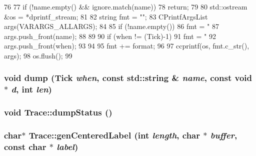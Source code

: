 \begin{DoxyCode}
76 {
77     if (!name.empty() && ignore.match(name))
78         return;
79 
80     std::ostream &os = *dprintf_stream;
81 
82     string fmt = "";
83     CPrintfArgsList args(VARARGS_ALLARGS);
84 
85     if (!name.empty()) {
86         fmt = "%
87         args.push_front(name);
88     }
89 
90     if (when != (Tick)-1) {
91         fmt = "%
92         args.push_front(when);
93     }
94 
95     fmt += format;
96 
97     ccprintf(os, fmt.c_str(), args);
98     os.flush();
99 }
\end{DoxyCode}
\hypertarget{namespaceTrace_a2fa429d80084fb5be809ab7b728be345}{
\subsubsection[{dump}]{\setlength{\rightskip}{0pt plus 5cm}void dump ({\bf Tick} {\em when}, \/  const std::string \& {\em name}, \/  const void $\ast$ {\em d}, \/  int {\em len})}}
\label{namespaceTrace_a2fa429d80084fb5be809ab7b728be345}
\hypertarget{namespaceTrace_a63d683419f79ed96f6bc3032736c4d4d}{
\subsubsection[{dumpStatus}]{\setlength{\rightskip}{0pt plus 5cm}void Trace::dumpStatus ()}}
\label{namespaceTrace_a63d683419f79ed96f6bc3032736c4d4d}
\hypertarget{namespaceTrace_a79a728bff493511191c670c3657933b4}{
\subsubsection[{genCenteredLabel}]{\setlength{\rightskip}{0pt plus 5cm}char$\ast$ Trace::genCenteredLabel (int {\em length}, \/  char $\ast$ {\em buffer}, \/  const char $\ast$ {\em label})}}
\label{namespaceTrace_a79a728bff493511191c670c3657933b4}



